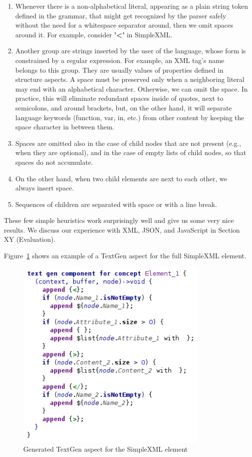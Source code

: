 \documentclass[10pt]{sigplanconf}
\begin{document}
\begin{enumerate}
	\item Whenever there is a non-alphabetical literal,	appearing as a plain string token defined in the grammar, that might get recognized by the parser safely without the need for a whitespace separator around, then we omit spaces around it.
		For example, consider \textbf{'\textless'} in SimpleXML.
	\item Another group are strings inserted by the user of the language, whose form is constrained by a regular expression.
		For example, an XML tag's name belongs to this group.
		They are usually values of properties defined in structure aspects.
		A space must be preserved only when a neighboring literal may end with an alphabetical character. Otherwise, we can omit the space.
		In practice, this will eliminate redundant spaces inside of quotes, next to semicolons, and around brackets, but, on the other hand, it will separate language keywords (function, var, in, etc.) from other content by keeping the space character in between them.
	\item Spaces are omitted also in the case of child nodes that are not present (e.g., when they are optional), and in the case of empty lists of child nodes, so that spaces do not accumulate.
	\item On the other hand, when two child elements are next to each other, we always insert space.
	\item Sequences of children are separated with space or with a line break.
\end{enumerate}
These few simple heuristics work surprisingly well and give us some very nice results.
We discuss our experience with XML, JSON, and JavaScript in Section XY (Evaluation).

Figure~\ref{fig:textgen_final} shows an example of a TextGen aspect for the full SimpleXML element.

\begin{figure}[ht]
	\centering
	\includegraphics[width=95mm]{./images/textgen_final.png}
	\caption{Generated TextGen aspect for the SimpleXML element}
	\label{fig:textgen_final}
\end{figure}
\end{document}
